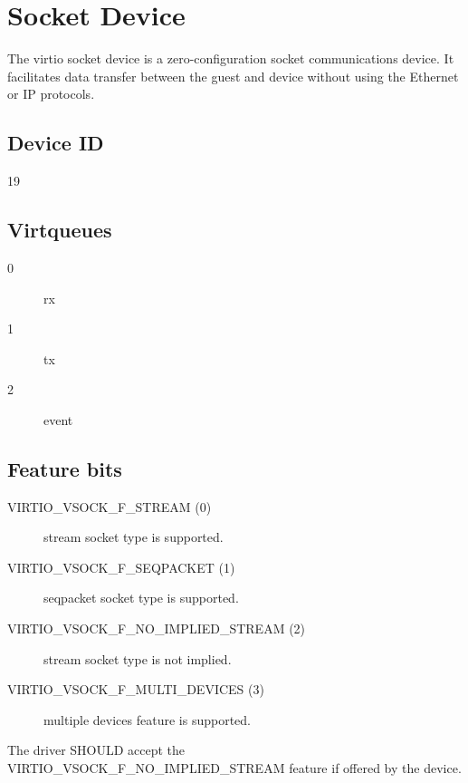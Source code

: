 \section{Socket Device}\label{sec:Device Types / Socket Device}

The virtio socket device is a zero-configuration socket communications device.
It facilitates data transfer between the guest and device without using the
Ethernet or IP protocols.

\subsection{Device ID}\label{sec:Device Types / Socket Device / Device ID}
  19

\subsection{Virtqueues}\label{sec:Device Types / Socket Device / Virtqueues}
\begin{description}
\item[0] rx
\item[1] tx
\item[2] event
\end{description}

\subsection{Feature bits}\label{sec:Device Types / Socket Device / Feature bits}

\begin{description}
\item[VIRTIO_VSOCK_F_STREAM (0)] stream socket type is supported.
\item[VIRTIO_VSOCK_F_SEQPACKET (1)] seqpacket socket type is supported.
\item[VIRTIO_VSOCK_F_NO_IMPLIED_STREAM (2)] stream socket type is not implied.
\item[VIRTIO_VSOCK_F_MULTI_DEVICES (3)] multiple devices feature is supported.
\end{description}


The driver SHOULD accept the VIRTIO_VSOCK_F_NO_IMPLIED_STREAM feature if
offered by the device.

